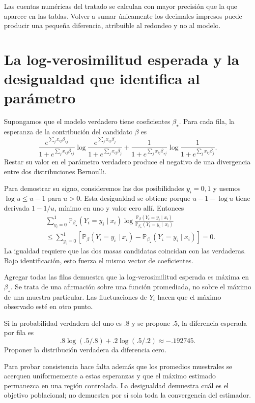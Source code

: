 \documentclass[11pt,a4paper]{article}
\newcommand{\Prob}{\mathbb P}
\begin{document}
Las cuentas numéricas del tratado se calculan con mayor precisión
que la que aparece en las tablas.
Volver a sumar únicamente los decimales impresos puede producir
una pequeña diferencia, atribuible al redondeo y no al modelo.

\clearpage
\section{La log-verosimilitud esperada y la desigualdad que identifica al parámetro}\label{logit51}
Supongamos que el modelo verdadero tiene coeficientes $\beta_\star$.
Para cada fila, la esperanza de la contribución del candidato $\beta$ es
\[
\frac{e^{\sum_jx_{ij}\beta_{\star j}}}
{1+e^{\sum_jx_{ij}\beta_{\star j}}}
\log\frac{e^{\sum_jx_{ij}\beta_j}}
{1+e^{\sum_jx_{ij}\beta_j}}
+
\frac1{1+e^{\sum_jx_{ij}\beta_{\star j}}}
\log\frac1{1+e^{\sum_jx_{ij}\beta_j}}.
\]
Restar su valor en el parámetro verdadero produce el negativo
de una divergencia entre dos distribuciones Bernoulli.

Para demostrar su signo, consideremos las dos posibilidades $y_i=0,1$
y usemos $\log u\le u-1$ para $u>0$.
Esta desigualdad se obtiene porque
$u-1-\log u$ tiene derivada $1-1/u$, mínimo en uno y valor cero allí.
Entonces
\[
\begin{aligned}
&\sum_{y_i=0}^1
\Prob_{\beta_\star}(Y_i=y_i\mid x_i)
\log\frac{\Prob_\beta(Y_i=y_i\mid x_i)}
{\Prob_{\beta_\star}(Y_i=y_i\mid x_i)}\\
&\le\sum_{y_i=0}^1
\left[\Prob_\beta(Y_i=y_i\mid x_i)
-\Prob_{\beta_\star}(Y_i=y_i\mid x_i)\right]=0.
\end{aligned}
\]
La igualdad requiere que las dos masas candidatas coincidan
con las verdaderas. Bajo identificación, esto fuerza el
mismo vector de coeficientes.

Agregar todas las filas demuestra que la log-verosimilitud
esperada es máxima en $\beta_\star$.
Se trata de una afirmación sobre una función promediada,
no sobre el máximo de una muestra particular.
Las fluctuaciones de $Y_i$ hacen que el máximo observado
esté en otro punto.

\begin{ejemplo}
Si la probabilidad verdadera del uno es $.8$ y se propone $.5$,
la diferencia esperada por fila es
\[
.8\log(.5/.8)+.2\log(.5/.2)\approx-.192745.
\]
Proponer la distribución verdadera da diferencia cero.
\end{ejemplo}
Para probar consistencia hace falta además que los promedios
muestrales se acerquen uniformemente a estas esperanzas y
que el máximo estimado permanezca en una región controlada.
La desigualdad demuestra cuál es el objetivo poblacional;
no demuestra por sí sola toda la convergencia del estimador.
\end{document}
